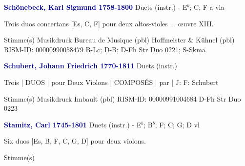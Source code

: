 \documentclass[twocolumn]{book}
\begin{document}
\newline \par \vspace{7pt} \textcolor{darkblue}{\textbf{Schönebeck, Karl Sigmund  1758-1800}}
\newline Duets (instr.) - E$^b$; C; F
 a-vla
\newline \begin{itshape}Trois duos concertans [Es, C, F] pour deux altos-violes ... œuvre XIII.\end{itshape} 
\newline \textcolor{darkblue}{}  Stimme(s)
\newline Musikdruck
\newline Bureau de Musique  (pbl)
\newline Hoffmeister \& Kühnel  (pbl)
\newline RISM-ID: 00000990058479
\newline B-Lc; D-B; D-Fh  Str Duo 0221; S-Skma
\newline \par \vspace{7pt} \textcolor{darkblue}{\textbf{Schubert, Johann Friedrich  1770-1811}}
\newline Duets (instr.)
\newline \begin{itshape}Trois | DUOS | pour Deux Violons | COMPOSÉS | par | J: F: Schubert\end{itshape} 
\newline \textcolor{darkblue}{}  Stimme(s)
\newline Musikdruck
\newline Imbault  (pbl)
\newline RISM-ID: 00000991004684
\newline D-Fh  Str Duo 0223
\newline \par \vspace{7pt} \textcolor{darkblue}{\textbf{Stamitz, Carl  1745-1801}}
\newline Duets (instr.) - E$^b$; B$^b$; F; C; G; D
 vl
\newline \begin{itshape}Six duos [Es, B, F, C, G, D] pour deux violons.\end{itshape} 
\newline \textcolor{darkblue}{}  Stimme(s)
\end{document}
